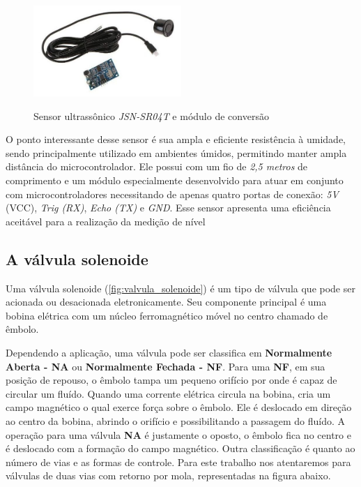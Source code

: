 \begin{figure}[H]
	\centering
	\caption{Sensor ultrassônico \textit{JSN-SR04T} e módulo de conversão}
	\includegraphics[width=0.5\textwidth]{figuras/sensor_ultra.jpg}
	\label{fig:sensor_ultra}
\end{figure}

O ponto interessante desse sensor é sua ampla e eficiente resistência à umidade, sendo principalmente utilizado em ambientes úmidos, permitindo manter ampla distância do microcontrolador. Ele possui com um fio de \textit{2,5 metros} de comprimento e um módulo especialmente desenvolvido para atuar em conjunto com microcontroladores necessitando de apenas quatro portas de conexão: \textit{5V} (VCC), \textit{Trig (RX)}, \textit{Echo (TX)} e \textit{GND}. Esse sensor apresenta uma eficiência aceitável para a realização da medição de nível


\subsection{A válvula solenoide}

Uma válvula solenoide (\autoref{fig:valvula_solenoide}) é um tipo de válvula que pode ser acionada ou desacionada eletronicamente. Seu componente principal é uma bobina elétrica com um núcleo ferromagnético móvel no centro chamado de êmbolo.

Dependendo a aplicação, uma válvula pode ser classifica em \textbf{Normalmente Aberta - NA} ou\textbf{ Normalmente Fechada - NF}. Para uma \textbf{NF}, em sua posição de repouso, o êmbolo tampa um pequeno orifício por onde é capaz de circular um fluído. Quando uma corrente elétrica circula na bobina, cria um campo magnético o qual exerce força sobre o êmbolo. Ele é deslocado em direção ao centro da bobina, abrindo o orifício e possibilitando a passagem do fluído. A operação para uma válvula \textbf{NA} é justamente o oposto, o êmbolo fica no centro e é deslocado com a formação do campo magnético. Outra classificação é quanto ao número de vias e as formas de controle. Para este trabalho nos atentaremos para válvulas de duas vias com retorno por mola, representadas na figura abaixo.

